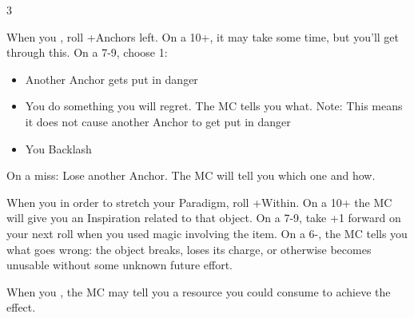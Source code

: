 \begin{multicols}{3}
\begin{move}
  \end{move}

  \SEPARATOR

  \vspace{-.1in}

  \begin{move}
    When you , roll +Anchors left. On a 10+, it may take some time, but you’ll get through this. On a 7-9, choose 1:

    \vspace{-.1in}
    \begin{itemize}
      \small
      \setlength\itemsep{-0.4em}
    \item Another Anchor gets put in danger
    \item You do something you will regret. The MC tells you what. Note: This means it does not cause another Anchor to get put in danger
    \item You Backlash 
    \end{itemize}
    \vspace{-.1in}
    On a miss: Lose another Anchor. The MC will tell you which one and how.

  \end{move}
  
  \SEPARATOR

  \vspace{-.1in}

  \begin{move}
    When you  in order to stretch your Paradigm, roll +Within. On a 10+ the MC will give you an Inspiration related to that object. On a 7-9, take +1 forward on your next roll when you used magic involving the item. On a 6-, the MC tells you what goes wrong: the object breaks, loses its charge, or otherwise becomes unusable without some unknown future effort.

  \end{move}

  \SEPARATOR

  \vspace{-.1in}

  \begin{move}
    When you , the MC may tell you a resource you could consume to achieve the effect.

  \end{move}

  \SEPARATOR


\end{multicols}
